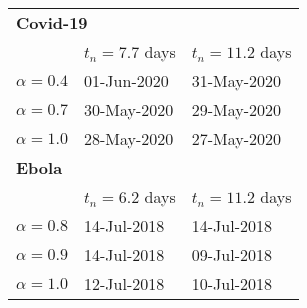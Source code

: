 \begin{tabular}{lll} 
\hline
\multicolumn{3}{l}{ \bf Covid-19} \\ 
 &  $t_n=7.7$ days & $t_n=11.2$ days \\ 
$\alpha=0.4$ & 01-Jun-2020 & 31-May-2020 \\ 
 $\alpha=0.7$ & 30-May-2020 & 29-May-2020 \\ 
 $\alpha=1.0$ & 28-May-2020 & 27-May-2020 \\ 
 \hline
\multicolumn{3}{l}{ \bf Ebola} \\ 
 &  $t_n=6.2$ days & $t_n=11.2$ days \\ 
$\alpha=0.8$ & 14-Jul-2018 & 14-Jul-2018 \\ 
 $\alpha=0.9$ & 14-Jul-2018 & 09-Jul-2018 \\ 
 $\alpha=1.0$ & 12-Jul-2018 & 10-Jul-2018 \\ 
 \hline
\end{tabular} 
